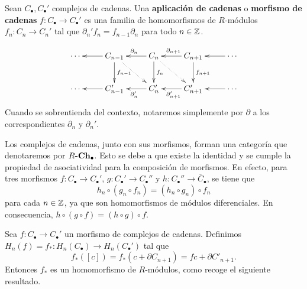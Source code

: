 \begin{definicion}
	Sean \(C_{\bullet},C_{\bullet}'\) complejos de cadenas. Una \textbf{aplicación
		de cadenas} o \textbf{morfismo de cadenas}
	\(f: C_{\bullet}\rightarrow C_{\bullet}'\) es una familia de homomorfismos de
	\(R\)-módulos \(f_{n}: C_{n}\rightarrow C_{n}'\) tal que
	\(\partial_{n}'f_{n}= f_{n-1}\partial_{n}\) para todo \(n \in \mathbb{Z}\).
\end{definicion}
\begin{equation}
	\label{chaincomplex}\xymatrix{ \cdots & C_{n-1} \ar[l] \ar[d]^{f_{n-1}} \ar@{..>}[dr] & C_n \ar[l]_{\partial_{n}} \ar[d]^{f_n} \ar@{..>}[dr] & C_{n+1} \ar[l]_{\partial_{n+1}} \ar[d]^{f_{n+1}} & \cdots \ar[l] \\ \cdots & C'_{n-1} \ar[l] & C'_n \ar[l]^{\partial'_{n}} & C'_{n+1} \ar[l]^{\partial'_{n+1}} & \cdots \ar[l] }
\end{equation}
Cuando se sobrentienda del contexto, notaremos simplemente por \(\partial\) a los correspondientes
\(\partial_{n}\) y \(\partial_{n}'\).

Los complejos de cadenas, junto con sus morfismos, forman una categoría que denotaremos
por \(R\textbf{-}\mathbf{Ch_\bullet}\). Esto se debe a que existe la identidad y se
cumple la propiedad de asociatividad para la composición de morfismos. En efecto,
para tres morfismos \(f : C_{\bullet} \to C_{\bullet}'\), \(g : C_{\bullet}' \to C_{\bullet}
''\) y \(h : C_{\bullet}'' \to \overline{C}_{\bullet}\), se tiene que
\[
h_{n} \circ (g_{n} \circ f_{n}) = (h_{n} \circ g_{n}) \circ f_{n}
\]
para cada \(n \in \mathbb{Z}\), ya que son homomorfismos de módulos diferenciales. En
consecuencia, \(h \circ (g \circ f) = (h \circ g) \circ f\).

Sea \(f : C_{\bullet} \to C_{\bullet}'\) un morfismo de complejos de cadenas.
Definimos \(H_{n}(f) = f_{*} : H_{n}(C_{\bullet}) \to H_{n}(C_{\bullet}')\) tal
que
\[
f_{*}([c]) = f_{*}(c + \partial C_{n+1}) = fc + \partial C'_{n+1}.
\]
Entonces \(f_{*}\) es un homomorfismo de \(R\)-módulos, como recoge el siguiente resultado.

